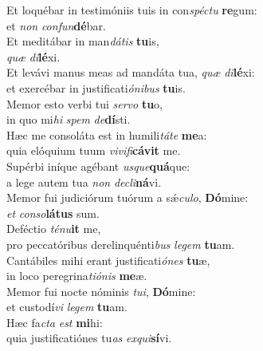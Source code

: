 \evenverse Et loquébar in testimóniis tuis in con\textit{spé}\textit{ctu} \textbf{re}gum:~\*\\
\evenverse et \textit{non} \textit{con}\textit{fun}\textbf{dé}bar.\\
\oddverse Et meditábar in man\textit{dá}\textit{tis} \textbf{tu}is,~\*\\
\oddverse \textit{quæ} \textit{di}\textbf{lé}xi.\\
\evenverse Et levávi manus meas ad mandáta tua, \textit{quæ} \textit{di}\textbf{lé}xi:~\*\\
\evenverse et exercébar in justificati\textit{ó}\textit{ni}\textit{bus} \textbf{tu}is.\\
\oddverse Memor esto verbi tui \textit{ser}\textit{vo} \textbf{tu}o,~\*\\
\oddverse in quo mi\textit{hi} \textit{spem} \textit{de}\textbf{dí}sti.\\
\evenverse Hæc me consoláta est in humili\textit{tá}\textit{te} \textbf{me}a:~\*\\
\evenverse quia elóquium tuum \textit{vi}\textit{vi}\textit{fi}\textbf{cá}\textbf{vit} me.\\
\oddverse Supérbi iníque agébant \textit{us}\textit{que}\textbf{quá}que:~\*\\
\oddverse a lege autem tua \textit{non} \textit{de}\textit{cli}\textbf{ná}vi.\\
\evenverse Memor fui judiciórum tuórum a sǽ\textit{cu}\textit{lo}, \textbf{Dó}mine:~\*\\
\evenverse \textit{et} \textit{con}\textit{so}\textbf{lá}\textbf{tus} sum.\\
\oddverse Deféctio \textit{té}\textit{nu}\textbf{it} me,~\*\\
\oddverse pro peccatóribus derelinquénti\textit{bus} \textit{le}\textit{gem} \textbf{tu}am.\\
\evenverse Cantábiles mihi erant justificati\textit{ó}\textit{nes} \textbf{tu}æ,~\*\\
\evenverse in loco peregrina\textit{ti}\textit{ó}\textit{nis} \textbf{me}æ.\\
\oddverse Memor fui nocte nóminis \textit{tu}\textit{i}, \textbf{Dó}mine:~\*\\
\oddverse et custodí\textit{vi} \textit{le}\textit{gem} \textbf{tu}am.\\
\evenverse Hæc fa\textit{cta} \textit{est} \textbf{mi}hi:~\*\\
\evenverse quia justificatiónes tu\textit{as} \textit{ex}\textit{qui}\textbf{sí}vi.\\
